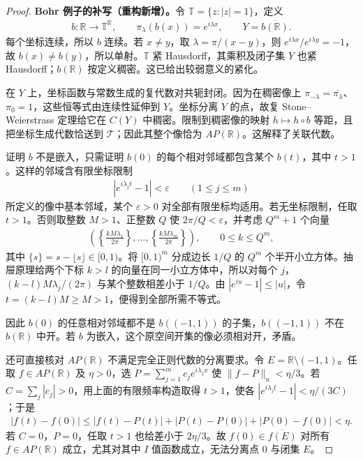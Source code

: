 \documentclass[../../main.tex]{subfiles}
\begin{document}
\begin{proof}
\textbf{Bohr 例子的补写（重构新增）。}令 $\mathbb T=\{z:|z|=1\}$，定义
\begin{align*}
b:\mathbb R\longrightarrow\mathbb T^{\mathbb R},\qquad
\pi_\lambda(b(x))=e^{i\lambda x},\qquad
Y=\overline{b(\mathbb R)}.
\end{align*}
每个坐标连续，所以 $b$ 连续。若 $x\ne y$，取 $\lambda=\pi/(x-y)$，则 $e^{i\lambda x}/e^{i\lambda y}=-1$，故 $b(x)\ne b(y)$，所以单射。$\mathbb T$ 紧 Hausdorff，其乘积及闭子集 $Y$ 也紧 Hausdorff；$b(\mathbb R)$ 按定义稠密。这已给出较弱意义的紧化。

在 $Y$ 上，坐标函数与常数生成的复代数对共轭封闭。因为在稠密像上 $\pi_{-\lambda}=\overline{\pi_\lambda}$、$\pi_0=1$，这些恒等式由连续性延伸到 $Y$。坐标分离 $Y$ 的点，故复 Stone--Weierstrass 定理给它在 $C(Y)$ 中稠密。限制到稠密像的映射 $h\mapsto h\circ b$ 等距，且把坐标生成代数恰送到 $\mathcal T$；因此其整个像恰为 $AP(\mathbb R)$。这解释了关联代数。

证明 $b$ 不是嵌入，只需证明 $b(0)$ 的每个相对邻域都包含某个 $b(t)$，其中 $t>1$。这样的邻域含有限坐标限制
\begin{align*}
|e^{i\lambda_jt}-1|<\varepsilon
\qquad(1\le j\le m)
\end{align*}
所定义的像中基本邻域，某个 $\varepsilon>0$ 对全部有限坐标均适用。若无坐标限制，任取 $t>1$。否则取整数 $M>1$、正整数 $Q$ 使 $2\pi/Q<\varepsilon$，并考虑 $Q^m+1$ 个向量
\begin{align*}
\left(\left\{\frac{kM\lambda_1}{2\pi}\right\},\ldots,
\left\{\frac{kM\lambda_m}{2\pi}\right\}\right),
\qquad 0\le k\le Q^m,
\end{align*}
其中 $\{s\}=s-\lfloor s\rfloor\in[0,1)$。将 $[0,1)^m$ 分成边长 $1/Q$ 的 $Q^m$ 个半开小立方体。抽屉原理给两个下标 $k>l$ 的向量在同一小立方体中，所以对每个 $j$，$(k-l)M\lambda_j/(2\pi)$ 与某个整数相差小于 $1/Q$。由 $|e^{iu}-1|\le|u|$，令 $t=(k-l)M\ge M>1$，便得到全部所需不等式。

因此 $b(0)$ 的任意相对邻域都不是 $b((-1,1))$ 的子集，$b((-1,1))$ 不在 $b(\mathbb R)$ 中开。若 $b$ 为嵌入，这个原空间开集的像必须相对开，矛盾。

还可直接核对 $AP(\mathbb R)$ 不满足完全正则代数的分离要求。令 $E=\mathbb R\setminus(-1,1)$。任取 $f\in AP(\mathbb R)$ 及 $\eta>0$，选 $P=\sum_{j=1}^m c_je^{i\lambda_jx}$ 使 $\|f-P\|_u<\eta/3$。若 $C=\sum_j|c_j|>0$，用上面的有限频率构造取得 $t>1$，使各 $|e^{i\lambda_jt}-1|<\eta/(3C)$；于是
\begin{align*}
|f(t)-f(0)|
\le |f(t)-P(t)|+|P(t)-P(0)|+|P(0)-f(0)|<\eta.
\end{align*}
若 $C=0$，$P=0$，任取 $t>1$ 也给差小于 $2\eta/3$。故 $f(0)\in\overline{f(E)}$ 对所有 $f\in AP(\mathbb R)$ 成立，尤其对其中 $I$ 值函数成立，无法分离点 $0$ 与闭集 $E$。


\end{proof}
\end{document}
